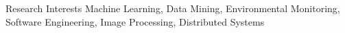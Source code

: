
\begin{rSection}{Research Interests}
Machine Learning, Data Mining, Environmental Monitoring, Software Engineering, Image Processing, Distributed Systems
\end{rSection}
